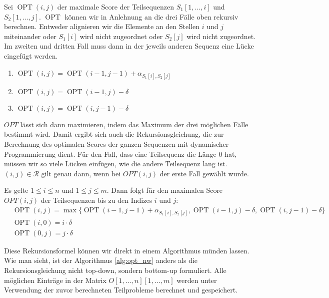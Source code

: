Sei $\operatorname{OPT}(i,j)$ der maximale Score der Teilsequenzen $S_1[1,\dots,i]$ und $S_2[1,\dots,j]$. $\operatorname{OPT}$ können wir in Anlehnung an die drei Fälle oben rekursiv berechnen. Entweder alignieren wir die Elemente an den Stellen $i$ und $j$ miteinander oder $S_1[i]$ wird nicht zugeordnet oder $S_2[j]$ wird nicht zugeordnet. Im zweiten und dritten Fall muss dann in der jeweils anderen Sequenz eine Lücke eingefügt werden.

\begin{enumerate}[topsep=0pt,itemsep=-1ex,partopsep=1ex,parsep=1ex]
	\item $\operatorname{OPT}(i,j) = \operatorname{OPT}(i-1,j-1) + \alpha_{S_1[i],S_2[j]}$
	\item $\operatorname{OPT}(i,j) = \operatorname{OPT}(i-1,j) - \delta$
	\item $\operatorname{OPT}(i,j) = \operatorname{OPT}(i,j-1) - \delta$
\end{enumerate}

$OPT$ lässt sich dann maximieren, indem das Maximum der drei möglichen Fälle bestimmt wird. Damit ergibt sich auch die Rekursionsgleichung, die zur Berechnung des optimalen Scores der ganzen Sequenzen mit dynamischer Programmierung dient. Für den Fall, dass eine Teilsequenz die Länge 0 hat, müssen wir so viele Lücken einfügen, wie die andere Teilsequenz lang ist. $(i,j) \in \mathcal{R}$ gilt genau dann, wenn bei $OPT(i,j)$ der erste Fall gewählt wurde.

\begin{korollar}\label{kor:opt}
	Es gelte $1 \leq i \leq n$ und $1 \leq j \leq m$. Dann folgt für den maximalen Score $OPT(i,j)$ der Teilsequenzen bis zu den Indizes $i$ und $j$:
	\begin{equation*}
	\begin{split}
	&\operatorname{OPT}(i,j) = \max\{\operatorname{OPT}(i-1,j-1) + \alpha_{S_1[i],S_2[j]}, \operatorname{OPT}(i-1,j) - \delta, \operatorname{OPT}(i,j-1) - \delta\} \\
	&\operatorname{OPT}(i,0) = i\cdot \delta \\
	&\operatorname{OPT}(0,j) = j\cdot \delta 
	\end{split}
	\end{equation*}
\end{korollar}

Diese Rekursionsformel können wir direkt in einem Algorithmus münden lassen. Wie man sieht, ist der Algorithmus \ref{alg:opt_nw} anders als die Rekursionsgleichung nicht top-down, sondern bottom-up formuliert. Alle möglichen Einträge in der Matrix $O[1,\dots,n][1,\dots,m]$ werden unter Verwendung der zuvor berechneten Teilprobleme berechnet und gespeichert. 

